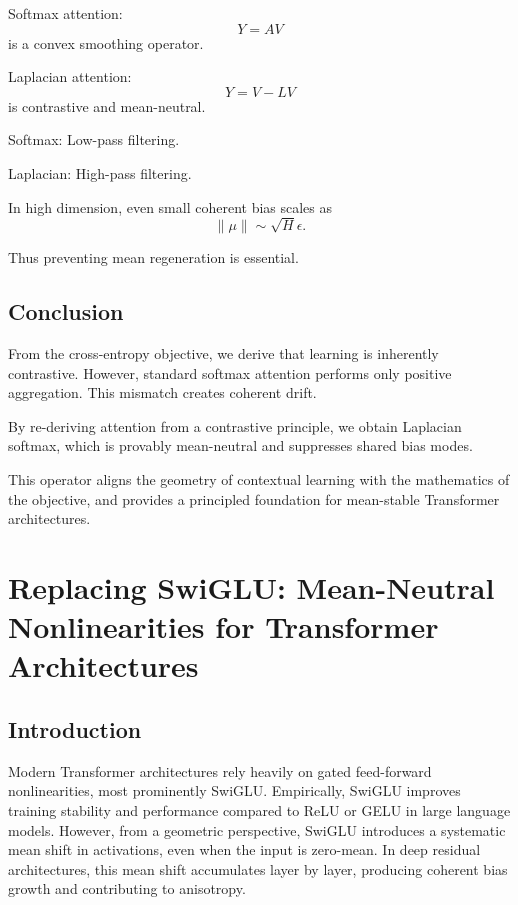 Softmax attention:
\begin{equation}
Y = AV
\end{equation}
is a convex smoothing operator.

Laplacian attention:
\begin{equation}
Y = V - LV
\end{equation}
is contrastive and mean-neutral.

Softmax:
Low-pass filtering.

Laplacian:
High-pass filtering.

In high dimension, even small coherent bias scales as
\begin{equation}
\|\mu\| \sim \sqrt{H}\epsilon.
\end{equation}

Thus preventing mean regeneration is essential.

\section{Conclusion}

From the cross-entropy objective,
we derive that learning is inherently contrastive.
However, standard softmax attention performs only
positive aggregation.
This mismatch creates coherent drift.

By re-deriving attention from a contrastive principle,
we obtain Laplacian softmax,
which is provably mean-neutral
and suppresses shared bias modes.

This operator aligns the geometry of contextual learning
with the mathematics of the objective,
and provides a principled foundation
for mean-stable Transformer architectures.


\chapter{Replacing SwiGLU: Mean-Neutral Nonlinearities for Transformer Architectures}

\section{Introduction}

Modern Transformer architectures rely heavily on gated feed-forward
nonlinearities, most prominently SwiGLU.
Empirically, SwiGLU improves training stability and performance compared to
ReLU or GELU in large language models.
However, from a geometric perspective, SwiGLU introduces a systematic mean
shift in activations, even when the input is zero-mean.
In deep residual architectures, this mean shift accumulates layer by layer,
producing coherent bias growth and contributing to anisotropy.

